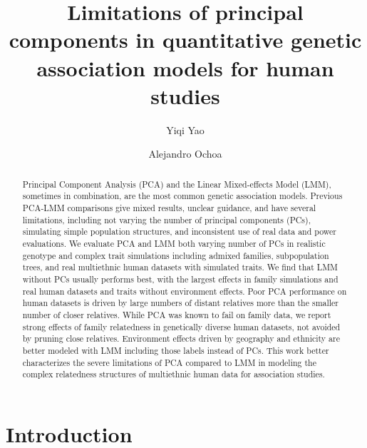 \documentclass[9pt,lineno]{elife}
\title{Limitations of principal components in quantitative genetic association models for human studies}
\author[1\authfn{3}]{Yiqi Yao}
\author[1,2*]{Alejandro Ochoa}
\affil[1]{Department of Biostatistics and Bioinformatics, Duke University, Durham, NC 27705, USA}
\affil[2]{Duke Center for Statistical Genetics and Genomics, Duke University, Durham, NC 27705, USA}
\begin{document}
\maketitle

\begin{abstract}
  Principal Component Analysis (PCA) and the Linear Mixed-effects Model (LMM), sometimes in combination, are the most common genetic association models.
  Previous PCA-LMM comparisons give mixed results, unclear guidance, and have several limitations, including not varying the number of principal components (PCs), simulating simple population structures, and inconsistent use of real data and power evaluations.
  We evaluate PCA and LMM both varying number of PCs in realistic genotype and complex trait simulations including admixed families, subpopulation trees, and real multiethnic human datasets with simulated traits.
  We find that LMM without PCs usually performs best, with the largest effects in family simulations and real human datasets and traits without environment effects.
  Poor PCA performance on human datasets is driven by large numbers of distant relatives more than the smaller number of closer relatives.
  While PCA was known to fail on family data, we report strong effects of family relatedness in genetically diverse human datasets, not avoided by pruning close relatives.
  Environment effects driven by geography and ethnicity are better modeled with LMM including those labels instead of PCs.
  This work better characterizes the severe limitations of PCA compared to LMM in modeling the complex relatedness structures of multiethnic human data for association studies.
\end{abstract}


\section{Introduction}
\end{document}
